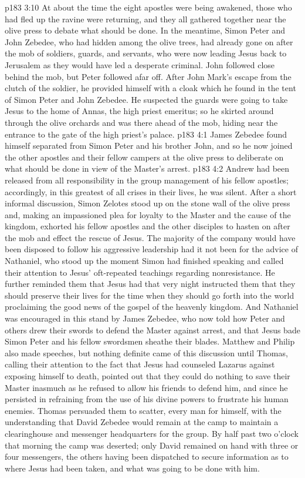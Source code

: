 \vs p183 3:10 At about the time the eight apostles were being awakened, those who had fled up the ravine were returning, and they all gathered together near the olive press to debate what should be done. In the meantime, Simon Peter and John Zebedee, who had hidden among the olive trees, had already gone on after the mob of soldiers, guards, and servants, who were now leading Jesus back to Jerusalem as they would have led a desperate criminal. John followed close behind the mob, but Peter followed afar off. After John Mark’s escape from the clutch of the soldier, he provided himself with a cloak which he found in the tent of Simon Peter and John Zebedee. He suspected the guards were going to take Jesus to the home of Annas, the high priest emeritus; so he skirted around through the olive orchards and was there ahead of the mob, hiding near the entrance to the gate of the high priest’s palace.
\vs p183 4:1 James Zebedee found himself separated from Simon Peter and his brother John, and so he now joined the other apostles and their fellow campers at the olive press to deliberate on what should be done in view of the Master’s arrest.
\vs p183 4:2 Andrew had been released from all responsibility in the group management of his fellow apostles; accordingly, in this greatest of all crises in their lives, he was silent. After a short informal discussion, Simon Zelotes stood up on the stone wall of the olive press and, making an impassioned plea for loyalty to the Master and the cause of the kingdom, exhorted his fellow apostles and the other disciples to hasten on after the mob and effect the rescue of Jesus. The majority of the company would have been disposed to follow his aggressive leadership had it not been for the advice of Nathaniel, who stood up the moment Simon had finished speaking and called their attention to Jesus’ oft\hyp{}repeated teachings regarding nonresistance. He further reminded them that Jesus had that very night instructed them that they should preserve their lives for the time when they should go forth into the world proclaiming the good news of the gospel of the heavenly kingdom. And Nathaniel was encouraged in this stand by James Zebedee, who now told how Peter and others drew their swords to defend the Master against arrest, and that Jesus bade Simon Peter and his fellow swordsmen sheathe their blades. Matthew and Philip also made speeches, but nothing definite came of this discussion until Thomas, calling their attention to the fact that Jesus had counseled Lazarus against exposing himself to death, pointed out that they could do nothing to save their Master inasmuch as he refused to allow his friends to defend him, and since he persisted in refraining from the use of his divine powers to frustrate his human enemies. Thomas persuaded them to scatter, every man for himself, with the understanding that David Zebedee would remain at the camp to maintain a clearinghouse and messenger headquarters for the group. By half past two o’clock that morning the camp was deserted; only David remained on hand with three or four messengers, the others having been dispatched to secure information as to where Jesus had been taken, and what was going to be done with him.
